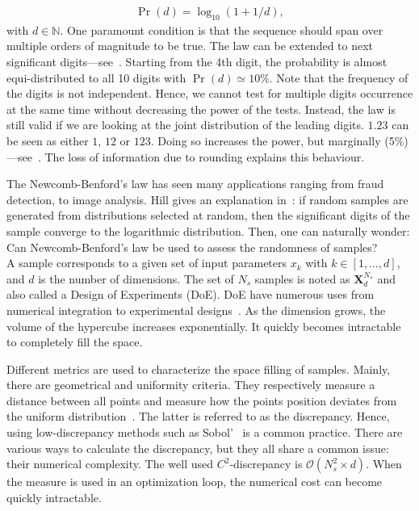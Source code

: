 \documentclass[1p,authoryear]{elsarticle}
\begin{document}
\begin{align}
	\Pr(d) = \log_{10}(1 + 1/d),
\end{align}
\noindent with $d \in \mathbb{N}$. One paramount condition is that the sequence should span over multiple orders of magnitude to be true. The law can be extended to next significant digits---see~\citep{Hill1995a}. Starting from the 4th digit, the probability is almost equi-distributed to all 10 digits with $\Pr(d) \simeq 10\%$. Note that the frequency of the digits is not independent. Hence, we cannot test for multiple digits occurrence at the same time without decreasing the power of the tests. Instead, the law is still valid if we are looking at the joint distribution of the leading digits. $1.23$ can be seen as either $1$, $12$ or $123$. Doing so increases the power, but marginally (5\%)---see~\citep{Joenssen2013}. The loss of information due to rounding explains this behaviour.

The Newcomb-Benford's law has seen many applications ranging from fraud detection, to image analysis. Hill gives an explanation in~\citep{Hill1995a}: if random samples are generated from distributions selected at random, then the significant digits of the sample converge to the logarithmic distribution. Then, one can naturally wonder:\\

Can Newcomb-Benford's law be used to assess the randomness of samples?\\

A sample corresponds to a given set of input parameters $x_k$ with $k \in [1, \dots , d]$, and $d$ is the number of dimensions. The set of $N_s$ samples is noted as $\mathbf{X}^{N_s}_d$ and also called a Design of Experiments (DoE). DoE have numerous uses from numerical integration to experimental designs~\citep{Sacks1989}. As the dimension grows, the volume of the hypercube increases exponentially. It quickly becomes intractable to completely fill the space. 

Different metrics are used to characterize the space filling of samples. Mainly, there are geometrical and uniformity criteria. They respectively measure a distance between all points and measure how the points position deviates from the uniform distribution~\citep{Fang2006,Androulakis2016}. The latter is referred to as the discrepancy. Hence, using low-discrepancy methods such as Sobol'~\citep{Sobol1967} is a common practice. There are various ways to calculate the discrepancy, but they all share a common issue: their numerical complexity. The well used $C^2$-discrepancy is $\mathcal{O}(N_s^2\times d)$. When the measure is used in an optimization loop, the numerical cost can become quickly intractable.
\end{document}
